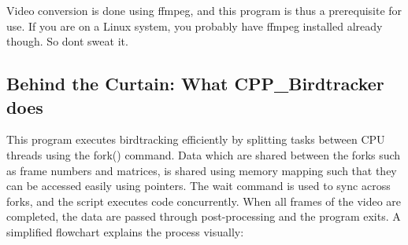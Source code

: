Video conversion is done using {\ttfamily ffmpeg}, and this program is thus a prerequisite for use. If you are on a Linux system, you probably have {\ttfamily ffmpeg} installed already though. So don\textquotesingle{}t sweat it.

\subsection*{Behind the Curtain\+: What C\+P\+P\+\_\+\+Birdtracker does}

This program executes birdtracking efficiently by splitting tasks between C\+PU threads using the {\ttfamily fork()} command. Data which are shared between the forks such as frame numbers and matrices, is shared using memory mapping such that they can be accessed easily using pointers. The {\ttfamily wait} command is used to sync across forks, and the script executes code concurrently. When all frames of the video are completed, the data are passed through post-\/processing and the program exits. A simplified flowchart explains the process visually\+:


